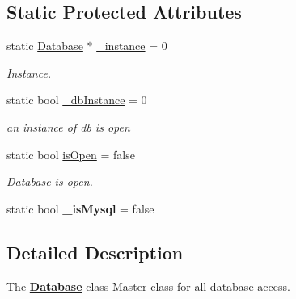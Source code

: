 \subsection*{Static Protected Attributes}
\begin{DoxyCompactItemize}
\item 
\hypertarget{classDatabases_1_1Database_a5f3ca7a29b769615feeac1c8b12f9a7e}{static \hyperlink{classDatabases_1_1Database}{Database} $\ast$ \hyperlink{classDatabases_1_1Database_a5f3ca7a29b769615feeac1c8b12f9a7e}{\-\_\-instance} = 0}\label{classDatabases_1_1Database_a5f3ca7a29b769615feeac1c8b12f9a7e}

\begin{DoxyCompactList}\small\item\em Instance. \end{DoxyCompactList}\item 
\hypertarget{classDatabases_1_1Database_a3bf8253398401fac46f74be67181877a}{static bool \hyperlink{classDatabases_1_1Database_a3bf8253398401fac46f74be67181877a}{\-\_\-db\-Instance} = 0}\label{classDatabases_1_1Database_a3bf8253398401fac46f74be67181877a}

\begin{DoxyCompactList}\small\item\em an instance of db is open \end{DoxyCompactList}\item 
\hypertarget{classDatabases_1_1Database_abdde0f6fbef7f4d7353acda867f01ca0}{static bool \hyperlink{classDatabases_1_1Database_abdde0f6fbef7f4d7353acda867f01ca0}{is\-Open} = false}\label{classDatabases_1_1Database_abdde0f6fbef7f4d7353acda867f01ca0}

\begin{DoxyCompactList}\small\item\em \hyperlink{classDatabases_1_1Database}{Database} is open. \end{DoxyCompactList}\item 
\hypertarget{classDatabases_1_1Database_a25138d7643dddc3b0fd587673fe84e7a}{static bool {\bfseries \-\_\-is\-Mysql} = false}\label{classDatabases_1_1Database_a25138d7643dddc3b0fd587673fe84e7a}

\end{DoxyCompactItemize}


\subsection{Detailed Description}
The {\bfseries \hyperlink{classDatabases_1_1Database}{Database}} class Master class for all database access. 


